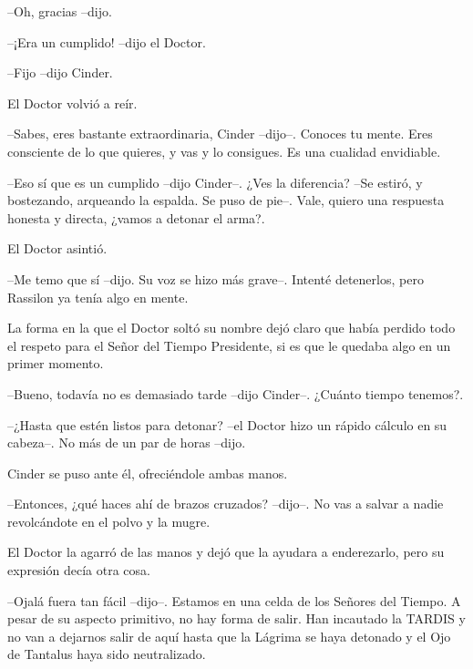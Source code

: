 --Oh, gracias --dijo.



--¡Era un cumplido! --dijo el Doctor.



--Fijo --dijo Cinder.



El Doctor volvió a reír.



--Sabes, eres bastante extraordinaria, Cinder --dijo--. Conoces tu mente. Eres consciente de lo que quieres, y vas y lo consigues. Es una cualidad envidiable.



--Eso sí que es un cumplido --dijo Cinder--. ¿Ves la diferencia? --Se estiró, y bostezando, arqueando la espalda. Se puso de pie--. Vale, quiero una respuesta honesta y directa, ¿vamos a detonar el arma?.



El Doctor asintió.

--Me temo que sí --dijo. Su voz se hizo más grave--. Intenté detenerlos, pero Rassilon ya tenía algo en mente.



La forma en la que el Doctor soltó su nombre dejó claro que había perdido todo el respeto para el Señor del Tiempo Presidente, si es que le quedaba algo en un primer momento.



--Bueno, todavía no es demasiado tarde --dijo Cinder--. ¿Cuánto tiempo tenemos?.



--¿Hasta que estén listos para detonar? --el Doctor hizo un rápido cálculo en su cabeza--. No más de un par de horas --dijo.



Cinder se puso ante él, ofreciéndole ambas manos.



--Entonces, ¿qué haces ahí de brazos cruzados? --dijo--. No vas a salvar a nadie revolcándote en el polvo y la mugre.



El Doctor la agarró de las manos y dejó que la ayudara a enderezarlo, pero su expresión decía otra cosa.



--Ojalá fuera tan fácil --dijo--. Estamos en una celda de los Señores del Tiempo. A pesar de su aspecto primitivo, no hay forma de salir. Han incautado la TARDIS y no van a dejarnos salir de aquí hasta que la Lágrima se haya detonado y el Ojo de Tantalus haya sido neutralizado.



